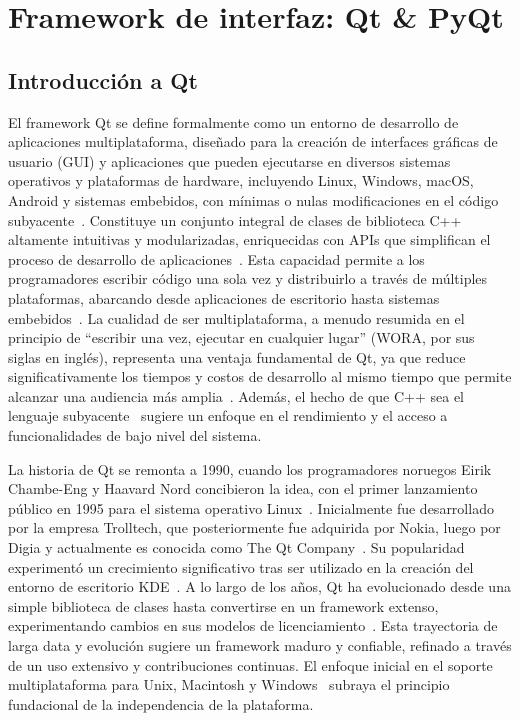 \section[FrameworkQt \& PyQt]{Framework de interfaz: Qt \& PyQt}

\subsection{Introducción a Qt}
El framework Qt se define formalmente como un entorno de desarrollo de aplicaciones multiplataforma, diseñado para la creación de interfaces gráficas de usuario (GUI) y aplicaciones que pueden ejecutarse en diversos sistemas operativos y plataformas de hardware, incluyendo Linux, Windows, macOS, Android y sistemas embebidos, con mínimas o nulas modificaciones en el código subyacente~\cite{qt_wiki}. Constituye un conjunto integral de clases de biblioteca C++ altamente intuitivas y modularizadas, enriquecidas con APIs que simplifican el proceso de desarrollo de aplicaciones~\cite{qt_framework}. Esta capacidad permite a los programadores escribir código una sola vez y distribuirlo a través de múltiples plataformas, abarcando desde aplicaciones de escritorio hasta sistemas embebidos~\cite{businesscloud}. La cualidad de ser multiplataforma, a menudo resumida en el principio de ``escribir una vez, ejecutar en cualquier lugar'' (WORA, por sus siglas en inglés), representa una ventaja fundamental de Qt, ya que reduce significativamente los tiempos y costos de desarrollo al mismo tiempo que permite alcanzar una audiencia más amplia~\cite{lemberg}. Además, el hecho de que C++ sea el lenguaje subyacente~\cite{qt_wiki} sugiere un enfoque en el rendimiento y el acceso a funcionalidades de bajo nivel del sistema.

La historia de Qt se remonta a 1990, cuando los programadores noruegos Eirik Chambe-Eng y Haavard Nord concibieron la idea, con el primer lanzamiento público en 1995 para el sistema operativo Linux~\cite{qt_history}. Inicialmente fue desarrollado por la empresa Trolltech, que posteriormente fue adquirida por Nokia, luego por Digia y actualmente es conocida como The Qt Company~\cite{qt_history}. Su popularidad experimentó un crecimiento significativo tras ser utilizado en la creación del entorno de escritorio KDE~\cite{qt_framework}. A lo largo de los años, Qt ha evolucionado desde una simple biblioteca de clases hasta convertirse en un framework extenso, experimentando cambios en sus modelos de licenciamiento~\cite{qt_framework}. Esta trayectoria de larga data y evolución sugiere un framework maduro y confiable, refinado a través de un uso extensivo y contribuciones continuas. El enfoque inicial en el soporte multiplataforma para Unix, Macintosh y Windows~\cite{qt_history} subraya el principio fundacional de la independencia de la plataforma.

